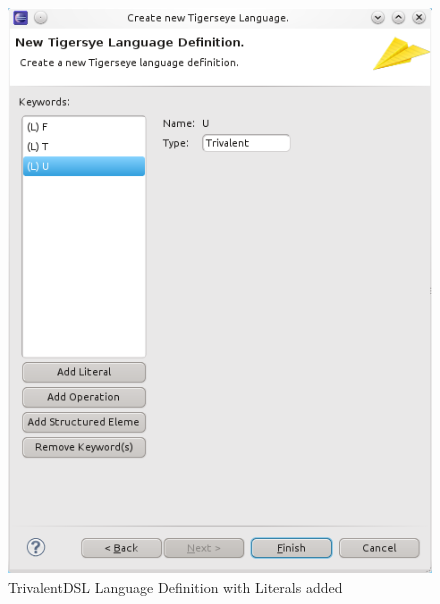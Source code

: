 \documentclass[article,colorback,accentcolor=tud4c]{tudreport}
\begin{document}
	\begin{figure}
	  \centering
	  \includegraphics[scale=.5,keepaspectratio=true]{./pics/example_newlang_literalsadded.png}
	  \caption{TrivalentDSL Language Definition with Literals added}\label{fig:example_newlang_literalsadded}
	\end{figure}
	
\end{document}
